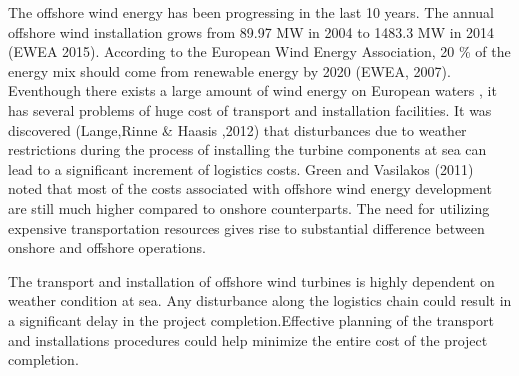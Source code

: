 \begin{introduction}

The offshore wind energy has been progressing in the last 10 years. The annual offshore wind installation grows from 89.97 MW in 2004 to 1483.3 MW in 2014 (EWEA 2015). According to the European Wind Energy Association, 20 \% of the energy mix should come from renewable energy by 2020 (EWEA, 2007). Eventhough there exists a large amount of wind energy on European waters , it has several problems of huge cost of transport and installation facilities. It was discovered (Lange,Rinne & Haasis ,2012) that disturbances due to weather restrictions during the process of installing the turbine components at sea can lead to a significant increment of logistics costs. Green and Vasilakos (2011) noted that most of the costs associated with offshore wind energy development are still much higher compared to onshore counterparts. The need for utilizing expensive transportation resources gives rise to substantial difference between onshore and offshore operations. 

The transport and installation of offshore wind turbines is highly dependent on weather condition at sea. Any disturbance along the logistics chain could result in a significant delay in the project completion.Effective planning of the transport and installations procedures could help minimize the entire cost of the project completion.

\end{introduction}
